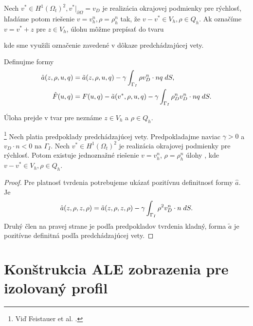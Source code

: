 Nech $v^* \in H^1(\Omega_t)^2, v^*|_{\partial\Omega}=v_D$ je realizácia okrajovej
podmienky pre rýchlosť, hľadáme potom riešenie $v=v_h^n,\rho=\rho_h^n$ tak, že
$v-v^* \in V_h,\rho\in Q_h$. Ak označíme $v=v^*+z$ pre $z\in V_h$, úlohu
 môžme prepísať do tvaru 


kde sme využili označenie zavedené v dôkaze predchádzajúcej vety.

Definujme formy 
\[
\begin{split}
\hat a(z,\rho,u,q) &= \tilde a(z,\rho,u,q) 
- \gamma \int_{\Gamma_I}{\rho v_D^n \cdot nq}\;dS, \\
\hat F(u,q) &= F(u,q) - \tilde a(v^*,\rho,u,q)
- \gamma \int_{\Gamma_I}{\rho_D^n v_D^n \cdot nq}\;dS. 
\end{split}
\]

Úloha  prejde v tvar
pre neznáme $z\in V_h$ a $\rho\in Q_h$.


\footnote{Viď Feistauer et al. \cite[p. 374]{feistauer}.}
Nech platia predpoklady predchádzajúcej vety. Predpokladajme naviac $\gamma>0$ a
$v_D\cdot n<0$  na $\Gamma_I$. Nech $v^* \in H^1(\Omega_t)^2$
je realizácia okrajovej podmienky pre rýchlosť. Potom existuje jednoznažné
riešenie $v=v_h^n$, $\rho=\rho_h^n$ úlohy
, 
kde $v-v^*\in V_h, \rho\in Q_h$. 
\begin{proof}

Pre platnosť tvrdenia potrebujeme ukázať pozitívnu definitnosť formy $\hat a$.
Je $$\hat a(z,\rho,z,\rho) = \tilde a(z,\rho,z,\rho) - 
\gamma \int_{\Gamma_I}{\rho^2 v_D^n \cdot n}\;dS.$$
Druhý člen na pravej strane je podľa predpokladov tvrdenia kladný, forma $\tilde a$ je
pozitívne definitná podľa predchádzajúcej vety.
\end{proof}



\chapter{Konštrukcia ALE zobrazenia pre izolovaný profil}

